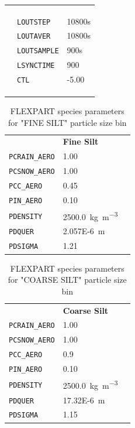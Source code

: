 \begin{table}[htpb]
\centering
\begin{tabular}{lll}
 &  &  \\
 &  &  \\
\rowcolor[HTML]{EFEFEF} 
 &  & \\
 & \verb|LOUTSTEP| & 10800s \\
\rowcolor[HTML]{EFEFEF} 
 & \verb|LOUTAVER| & 10800s \\
 & \verb|LOUTSAMPLE| & 900s  \\
\rowcolor[HTML]{EFEFEF} 
 & \verb|LSYNCTIME| & 900  \\
 & \verb|CTL|  & -5.00 \\
\rowcolor[HTML]{EFEFEF} 
 &  &  \\
 &  &  \\
\rowcolor[HTML]{EFEFEF} 
 &  & 
\end{tabular}
\end{table}

\begin{table}[htpb]
\centering
\begin{tabular}{lll}
 & \textbf{Fine Silt} & \\
\rowcolor[HTML]{EFEFEF} 
 \verb|PCRAIN_AERO|& 1.00  \\
 \verb|PCSNOW_AERO|& 1.00  \\
\rowcolor[HTML]{EFEFEF} 
 \verb|PCC_AERO|& 0.45 \parencite{flexdust_ref_2016}  \\
 \verb|PIN_AERO|& 0.10 \parencite{flexdust_ref_2016}  \\
\rowcolor[HTML]{EFEFEF} 
 \verb|PDENSITY|& \SI{2500.0}{\kg\per\cubic\metre}   \\
 \verb|PDQUER|& \SI{2.057E-6}{\metre}   \\
\rowcolor[HTML]{EFEFEF} 
 \verb|PDSIGMA|&1.21   
\end{tabular}

\caption{FLEXPART species parameters for "FINE SILT" particle size bin}
\label{Table_species_fine_silt}
\end{table}

\begin{table}[htpb]
\centering
\begin{tabular}{lll}
 & \textbf{Coarse Silt} & \\
\rowcolor[HTML]{EFEFEF} 
 \verb|PCRAIN_AERO|& 1.00  \\
 \verb|PCSNOW_AERO|& 1.00  \\
\rowcolor[HTML]{EFEFEF} 
 \verb|PCC_AERO|& 0.9 \parencite{flexdust_ref_2016}  \\
 \verb|PIN_AERO|& 0.10 \parencite{flexdust_ref_2016}  \\
\rowcolor[HTML]{EFEFEF} 
 \verb|PDENSITY|& \SI{2500.0}{\kg\per\cubic\metre} \\
 \verb|PDQUER|& \SI{17.32E-6}{\metre}   \\
\rowcolor[HTML]{EFEFEF} 
 \verb|PDSIGMA|&1.15   
\end{tabular}
\caption{FLEXPART species parameters for "COARSE SILT" particle size bin}
\label{Table_species_coaurse}
\end{table}

